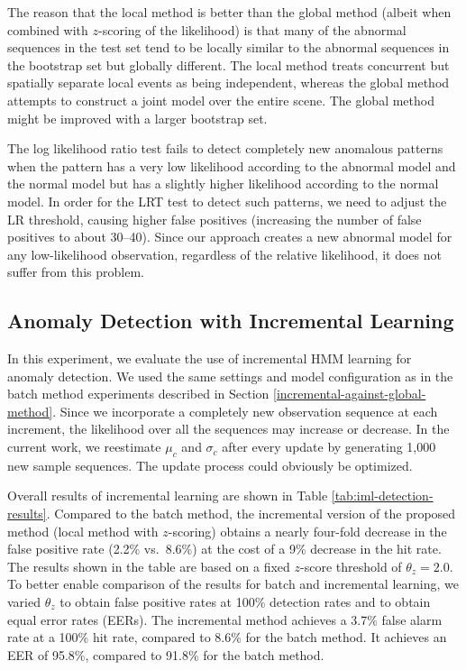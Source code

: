 The reason that the local method is better than the global method
(albeit when combined with $z$-scoring of the likelihood) is that many
of the abnormal sequences in the test set tend to be locally similar
to the abnormal sequences in the bootstrap set but globally
different. The local method treats concurrent but spatially separate
local events as being independent, whereas the global method attempts
to construct a joint model over the entire scene.  The global method
might be improved with a larger bootstrap set.


The log likelihood ratio test fails to detect completely new anomalous
patterns when the pattern has a very low likelihood according to the
abnormal model and the normal model but has a slightly higher
likelihood according to the normal model. In order for the LRT test to
detect such patterns, we need to adjust the LR threshold, causing
higher false positives (increasing the number of false positives to
about 30--40).  Since our approach creates a new abnormal model for
any low-likelihood observation, regardless of the relative likelihood,
it does not suffer from this problem.

\subsection{Anomaly Detection with Incremental Learning}

In this experiment, we evaluate the use of incremental HMM learning
for anomaly detection. We used the same settings and model
configuration as in the batch method experiments described in Section
\ref{incremental-against-global-method}.  Since we incorporate a completely
new observation sequence at each increment, the likelihood over all
the sequences may increase or decrease. In the current work, we
reestimate $\mu_c$ and $\sigma_c$ after every update by generating
1,000 new sample sequences.  The update process could obviously be
optimized.

Overall results of incremental learning are shown in Table
\ref{tab:iml-detection-results}. Compared to the batch method, the
incremental version of the proposed method (local method with
$z$-scoring) obtains a nearly four-fold decrease in the false positive
rate (2.2\% vs.\ 8.6\%) at the cost of a 9\% decrease in the hit rate.
The results shown in the table are based on a fixed $z$-score
threshold of $\theta_z=2.0$.  To better enable comparison of the
results for batch and incremental learning, we varied $\theta_z$ to
obtain false positive rates at 100\% detection rates and to obtain
equal error rates (EERs). The incremental method achieves a 3.7\%
false alarm rate at a 100\% hit rate, compared to 8.6\% for the batch
method.  It achieves an EER of 95.8\%, compared to 91.8\% for the
batch method.

